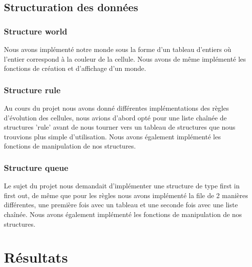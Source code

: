 \documentclass{article}
\begin{document}
{{{        }
    
    
    }
    \bigskip
    \subsection{Structuration des données}
        {
        \subsubsection{Structure world}
            {
            Nous avons implémenté notre monde sous la forme d'un tableau d'entiers où l'entier correspond à la couleur de la cellule. Nous avons de même implémenté les fonctions de création et d'affichage d'un monde.
            
            
           
            }
        \subsubsection{Structure rule}
            {
            Au cours du projet nous avons donné différentes implémentations des règles d'évolution des cellules, nous avions d'abord opté pour une liste chaînée de structures 'rule' avant de nous tourner vers un tableau de structures que nous trouvions plus simple d'utilisation. Nous avons également implémenté les fonctions de manipulation de nos structures.
        
           
            }
        \subsubsection{Structure queue}
            {
            Le sujet du projet nous demandait d'implémenter une structure de type first in first out, de même que pour les règles nous avons implémenté la file de 2 manières différentes, une première fois avec un tableau et une seconde fois avec une liste chaînée. Nous avons également implémenté les fonctions de manipulation de nos structures.
             
            }
    
    
    
        }
    
    
    
    
    
    }


\newpage
\section{Résultats}
\end{document}
